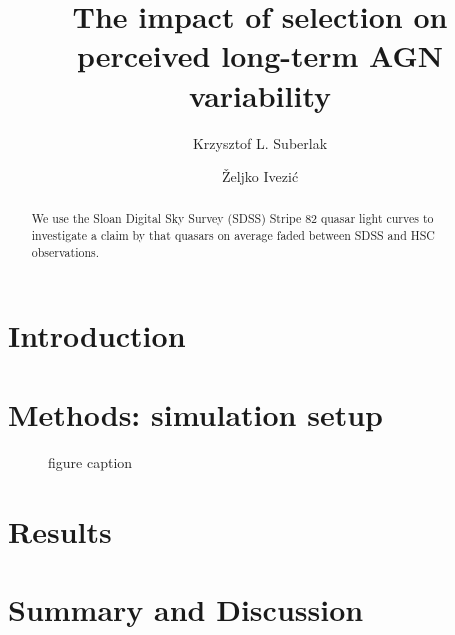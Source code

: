 \documentclass[twocolumn]{aastex62}
\begin{document}
\title{The impact of selection on perceived long-term AGN variability}


\author[0000-0002-9589-1306]{Krzysztof L. Suberlak}


\author[0000-0001-5250-2633]{\v{Z}eljko Ivezi\'c}


\begin{abstract}

We use the Sloan Digital Sky Survey (SDSS) Stripe 82 quasar light curves to investigate a claim by \citet{caplar2020} that quasars on average faded between SDSS and HSC observations.

\end{abstract}


\section{Introduction}
\label{sec:introduction}
%
%
%
\section{Methods: simulation setup}
\label{sec:methods}

\begin{figure*}  %
	\caption{figure caption} 
	\label{fig:}
\end{figure*}
 

\section{Results}



\section{Summary and Discussion}
 





 


\end{document}
